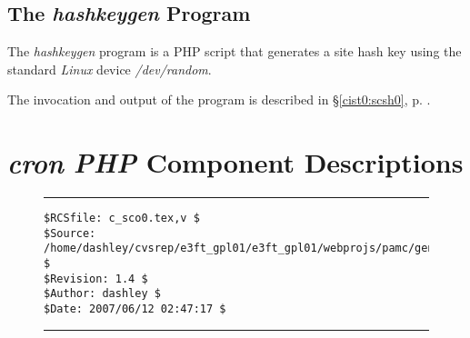 \subsection{The \emph{hashkeygen} Program}
\label{csco0:ssph0:shkg0}

The \emph{hashkeygen} program is a PHP
script that generates a site hash key using the standard \emph{Linux}
device \emph{/dev/random}.

The invocation and output of the program is described in 
\S{}\ref{cist0:scsh0}, p. \pageref{cist0:scsh0}.


\section{\emph{cron} \emph{PHP} Component Descriptions}
\label{csco0:scph0}



\noindent\begin{figure}[!b]
\noindent\rule[-0.25in]{\textwidth}{1pt}
\begin{tiny}
\begin{verbatim}
$RCSfile: c_sco0.tex,v $
$Source: /home/dashley/cvsrep/e3ft_gpl01/e3ft_gpl01/webprojs/pamc/gen_a/docs/manual/man_a/c_sco0/c_sco0.tex,v $
$Revision: 1.4 $
$Author: dashley $
$Date: 2007/06/12 02:47:17 $
\end{verbatim}
\end{tiny}
\noindent\rule[0.25in]{\textwidth}{1pt}
\end{figure}

%
%
%
%
